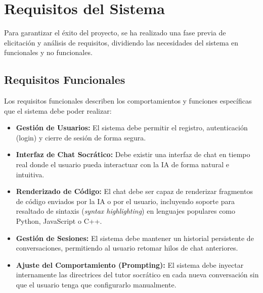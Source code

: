 \section{Requisitos del Sistema}
Para garantizar el éxito del proyecto, se ha realizado una fase previa de elicitación y análisis de requisitos, dividiendo las necesidades del sistema en funcionales y no funcionales.

\subsection{Requisitos Funcionales}
Los requisitos funcionales describen los comportamientos y funciones específicas que el sistema debe poder realizar:
\begin{itemize}
    \item \textbf{Gestión de Usuarios:} El sistema debe permitir el registro, autenticación (login) y cierre de sesión de forma segura.
    \item \textbf{Interfaz de Chat Socrático:} Debe existir una interfaz de chat en tiempo real donde el usuario pueda interactuar con la IA de forma natural e intuitiva.
    \item \textbf{Renderizado de Código:} El chat debe ser capaz de renderizar fragmentos de código enviados por la IA o por el usuario, incluyendo soporte para resaltado de sintaxis (\textit{syntax highlighting}) en lenguajes populares como Python, JavaScript o C++.
    \item \textbf{Gestión de Sesiones:} El sistema debe mantener un historial persistente de conversaciones, permitiendo al usuario retomar hilos de chat anteriores.
    \item \textbf{Ajuste del Comportamiento (Prompting):} El sistema debe inyectar internamente las directrices del tutor socrático en cada nueva conversación sin que el usuario tenga que configurarlo manualmente.
\end{itemize}

